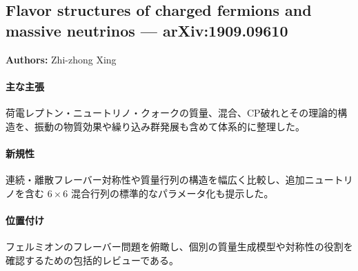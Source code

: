 \subsection{Flavor structures of charged fermions and massive neutrinos --- arXiv:1909.09610}

\textbf{Authors:} Zhi-zhong Xing

\paragraph{主な主張}
荷電レプトン・ニュートリノ・クォークの質量、混合、CP破れとその理論的構造を、振動の物質効果や繰り込み群発展も含めて体系的に整理した\cite{Xing:2020ijf}。

\paragraph{新規性}
連続・離散フレーバー対称性や質量行列の構造を幅広く比較し、追加ニュートリノを含む $6\times6$ 混合行列の標準的なパラメータ化も提示した。

\paragraph{位置付け}
フェルミオンのフレーバー問題を俯瞰し、個別の質量生成模型や対称性の役割を確認するための包括的レビューである。
